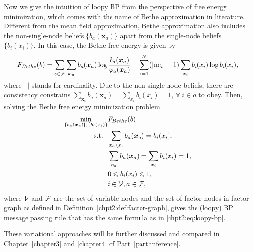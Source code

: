 Now we give the intuition of loopy BP from the perspective of free energy minimization, which comes with the name of Bethe approximation in literature.
Different from the mean field approximation, Bethe approximation also includes the non-single-node beliefs $\{b_{a}(\bm{x}_{a})\}$ apart from the single-node beliefs $\{b_i(x_i)\}$\cite{yedidia2003understanding}. In this case, the Bethe free energy is given by
\begin{align}\label{chpt2:bethe-free-energy}
  F_{Bethe}(b) = \sum_{a\in \mathcal{F}} \sum_{\bm{x}_{a}}
  b_{a}(\bm{x}_{a})\log{\frac{b_{a}(\bm{x}_{a})}{\varphi_{a}(\bm{x}_{a})}
  } -  \sum_{i=1}^{N} (|\mathrm{ne}_i| - 1) \sum_{x_i} b_i(x_i) \log{b_i(x_i)},
\end{align}
where $|\cdot|$ stands for cardinality.
Due to the  non-single-node beliefs, there are consistency constrains $\sum_{\bm{x}_{a}} b_{a}(\bm{x}_{a}) = \sum_{ x_i} b_i({x}_i) =1$, $\forall~ i \in a$ to obey. Then, solving the Bethe free energy minimization problem
\begin{align}
  \min_{\{b_{a}(\bm{x}_{a})\}, \{b_i(x_i)\}}& F_{Bethe}(b) \nonumber \\
  \mathrm{s.t.}~~ & \sum_{\bm{x}_{a} \backslash x_i} b_{a}(\bm{x}_{a})  =
                    b_i(x_i), \nonumber \\
                                                      & \sum_{\bm{x}_{a}} b_{a}(\bm{x}_{a}) = \sum_{ x_i} b_i({x}_i) =1,
                                                        \nonumber \\
                                                      &  0 \leqslant b_i(x_i) \leqslant 1,  \nonumber \\
                                                      & i \in \mathcal{V} , a \in \mathcal{F},
\end{align}
where $\mathcal{V}$ and $\mathcal{F}$ are the set of variable nodes and the set of
factor nodes in factor graph as defined in
Definition~\ref{chpt2:def:factor-graph}, gives the (loopy) BP message passing rule that has the same formula as in \eqref{chpt2:eq:loopy-bp}.

These variational approaches will be further discussed and compared in Chapter~\ref{chapter3} and \ref{chapter4} of Part~\ref{part:inference}.

